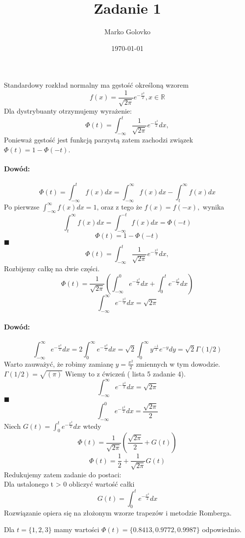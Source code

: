 \documentclass[12pt]{article}
\title{Zadanie 1}
\author{Marko Golovko}
\date{\today}
\renewcommand{\qedsymbol}{$\blacksquare$}
\begin{document}
\maketitle

Standardowy rozkład normalny ma gęstość określoną wzorem
	$$ f(x) = \frac{1}{\sqrt{2\pi}}e^{-\frac{x^2}{2}}, x\in\mathbb{R}$$
Dla dystrybuanty otrzymujemy wyrażenie:
	$$ \Phi(t) = \int_{-\infty}^{t} \frac{1}{\sqrt{2\pi}}e^{-\frac{x^2}{2}} dx,$$
Ponieważ gęstość jest funkcją
parzystą zatem zachodzi związek $\Phi(t) = 1 - \Phi(-t)$.
\paragraph{Dowód:}
$$\Phi(t)= \int_{-\infty}^{t}f(x)dx = \int_{-\infty}^{\infty}f(x)dx - \int_{t}^{\infty}f(x)dx$$
Po pierwzse $ \int_{-\infty}^{\infty}f(x)dx = 1 $, oraz z tego że $f(x) = f(-x),$ wynika 
$$\int_{t}^{\infty}f(x)dx =  \int_{-\infty}^{-t}f(x)dx = \Phi(-t)$$
$$\Phi(t) = 1 - \Phi(-t)$$
\flushright\qedsymbol
\flushleft
$$ \Phi(t) = \int_{-\infty}^{t} \frac{1}{\sqrt{2\pi}}e^{-\frac{x^2} {2}} dx,$$
Rozbijemy całkę na dwie części.
$$ \Phi(t) = \frac{1}{\sqrt{2\pi}}(\int_{-\infty}^{0} e^{-\frac{x^2} {2}} dx + \int_{0}^{t} e^{-\frac{x^2} {2}} dx)$$
$$ \int_{-\infty}^{\infty} e^{-\frac{x^2} {2}} dx = \sqrt{2\pi} $$
\paragraph{Dowód:}
$$ \int_{-\infty}^{\infty} e^{-\frac{x^2} {2}} dx = 2\int_{0}^{\infty} e^{-\frac{x^2} {2}}dx = \sqrt{2}\int_{0}^{\infty} y^{\frac{-1}{2}}e^{-y}dy = \sqrt{2}\Gamma(1/2) $$
Warto zauważyć, że robimy zamianę $y = \frac{x^{2}}{2}$ zmiennych w tym dowodzie.\\
$\Gamma(1/2) = \sqrt{(\pi)} $ Wiemy to z ćwiczeń ( lista 5 zadanie 4).
$$ \int_{-\infty}^{\infty} e^{-\frac{x^2} {2}} dx = \sqrt{2\pi} $$
\flushright\qedsymbol
\flushleft
$$ \int_{-\infty}^{0} e^{-\frac{x^2} {2}} dx = \frac{\sqrt{2\pi}}{2} $$
Niech $ G(t) = \int_{0}^{t} e^{-\frac{x^2} {2}} dx $ wtedy 
$$ \Phi(t) = \frac{1}{\sqrt{2\pi}}(\frac{\sqrt{2\pi}}{2} + G(t)) $$
$$ \Phi(t) = \frac{1}{2} + \frac{1}{\sqrt{2\pi}}G(t) $$
Redukujemy zatem zadanie do postaci: \\
\quad Dla ustalonego t > 0 obliczyć wartość całki $$ G(t) = \int_{0}^{t} e^{-\frac{x^2} {2}} dx $$
Rozwiązanie opiera się na złożonym wzorze trapezów i metodzie Romberga.
\cleardoublepage

\BlankLine
Dla $t=\{1,2,3\}$ mamy wartości $\Phi(t) = \{0.8413, 0.9772, 0.9987\}$ odpowiednio.
\end{document}
